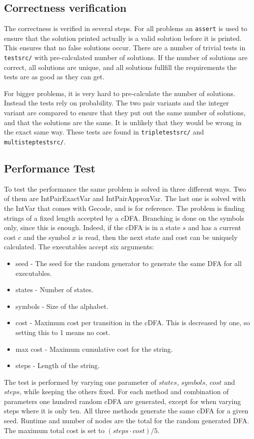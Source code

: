 \documentclass[a4paper,11pt]{article}
\begin{document}
\subsection{Correctness verification}
The correctness is verified in several steps. For all problems an \texttt{assert} is used to ensure that the solution printed actually is a valid solution before it is printed. This ensures that no false solutions occur. There are a number of trivial tests in \texttt{testsrc/} with pre-calculated number of solutions. If the number of solutions are correct, all solutions are unique, and all solutions fullfill the requirements the tests are as good as they can get.

For bigger problems, it is very hard to pre-calculate the number of solutions. Instead the tests rely on probability. The two pair variants and the integer variant are compared to ensure that they put out the same number of solutions, and that the solutions are the same. It is unlikely that they would be wrong in the exact same way. These tests are found in \texttt{tripletestsrc/} and \texttt{multisteptestsrc/}.

\subsection{Performance Test}
\label{sec:performancetest}
To test the performance the same problem is solved in three different ways. Two of them are IntPairExactVar and IntPairApproxVar. The last one is solved with the IntVar that comes with Gecode, and is for reference. The problem is finding strings of a fixed length accepted by a cDFA. Branching is done on the symbols only, since this is enough. Indeed, if the cDFA is in a state $s$ and has a current cost $c$ and the symbol $x$ is read, then the next state and cost can be uniquely calculated. The executables accept six arguments: 
\begin{itemize}
\item{seed} - The seed for the random generator to generate the same DFA for all executables.
\item{states} - Number of states.
\item{symbols} - Size of the alphabet.
\item{cost} - Maximum cost per transition in the cDFA. This is decreased by one, so setting this to 1 means no cost.
\item{max cost} - Maximum cumulative cost for the string.
\item{steps} - Length of the string.
\end{itemize}
The test is performed by varying one parameter of $states$, $symbols$, $cost$ and $steps$, while keeping the others fixed. For each method and combination of parameters one hundred random cDFA are generated, except for when varying steps where it is only ten. All three methods generate the same cDFA for a given seed. Runtime and number of nodes are the total for the random generated DFA. The maximum total cost is set to $(steps\cdot cost)/5$.
\end{document}
